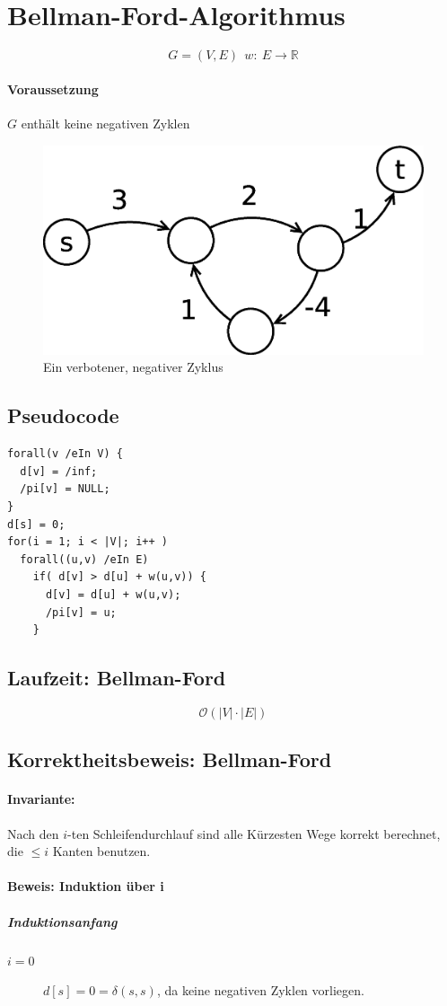 \section{Bellman-Ford-Algorithmus}
\[ G=(V,E)~~w:~E\rightarrow \mathbb{R} \]
\paragraph{Voraussetzung}
$G$ enthält keine negativen Zyklen
\begin{figure}[h]
\centering
\includegraphics[width=0.7\linewidth]{17/Grafik/Skizze3}
\caption{Ein verbotener, negativer Zyklus}
\label{fig:Skizze3}
\end{figure}
\subsection{Pseudocode}
\begin{lstlisting}
forall(v /eIn V) {
  d[v] = /inf;
  /pi[v] = NULL;
}
d[s] = 0;
for(i = 1; i < |V|; i++ )
  forall((u,v) /eIn E)
    if( d[v] > d[u] + w(u,v)) {
      d[v] = d[u] + w(u,v);
      /pi[v] = u;
    }
\end{lstlisting}
\subsection{Laufzeit: Bellman-Ford}
\[ \mathcal{O}(|V|\cdot|E|) \]
\subsection{Korrektheitsbeweis: Bellman-Ford}
\paragraph{Invariante:}
Nach den $i$-ten Schleifendurchlauf sind alle Kürzesten Wege korrekt berechnet, die $\leq i$ Kanten benutzen.
\paragraph{Beweis: Induktion über i}
\subparagraph{Induktionsanfang}
\begin{description}
	\item[$i=0$] $d[s] = 0 = \delta(s,s)$, da keine negativen Zyklen vorliegen.
\end{description}
